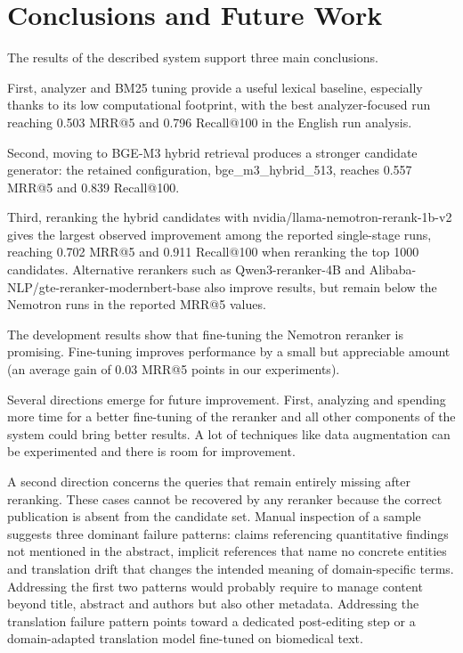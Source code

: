\section{Conclusions and Future Work}
\label{sec:conclusion}

The results of the described system support three main conclusions.

First, analyzer and BM25 tuning provide a useful lexical baseline, especially thanks to its low computational footprint, with the best analyzer-focused run reaching 0.503 MRR@5 and 0.796 Recall@100 in the English run analysis.

Second, moving to BGE-M3 hybrid retrieval produces a stronger candidate generator: the retained configuration, bge\_m3\_hybrid\_513, reaches 0.557 MRR@5 and 0.839 Recall@100.

Third, reranking the hybrid candidates with nvidia/llama-nemotron-rerank-1b-v2 gives the largest observed improvement among the reported single-stage runs, reaching 0.702 MRR@5 and 0.911 Recall@100 when reranking the top 1000 candidates. Alternative rerankers such as Qwen3-reranker-4B and Alibaba-NLP/gte-reranker-modernbert-base also improve results, but remain below the Nemotron runs in the reported MRR@5 values.

The development results show that fine-tuning the Nemotron reranker is promising. Fine-tuning improves performance by a small but appreciable amount (an average gain of 0.03 MRR@5 points in our experiments).

Several directions emerge for future improvement. 
First, analyzing and spending more time for a better fine-tuning of the reranker and all other components of the system could bring better results. A lot of techniques like data augmentation can be experimented and there is room for improvement.

A second direction concerns the queries that remain entirely missing after reranking. These cases cannot be recovered by any reranker because the correct publication is absent from the candidate set. Manual inspection of a sample suggests three dominant failure patterns: claims referencing quantitative findings not mentioned in the abstract, implicit references that name no concrete entities and translation drift that changes the intended meaning of domain-specific terms. Addressing the first two patterns would probably require to manage content beyond title, abstract and authors but also other metadata. Addressing the translation failure pattern points toward a dedicated post-editing step or a domain-adapted translation model fine-tuned on biomedical text.

